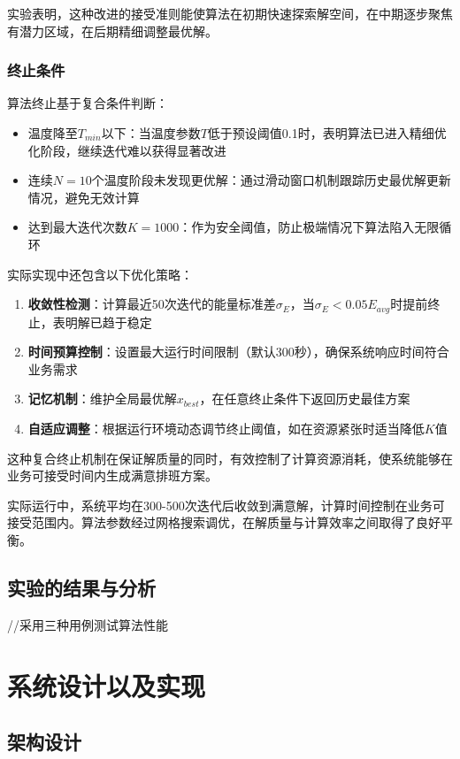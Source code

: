 \documentclass{ctexart}
\begin{document}
实验表明，这种改进的接受准则能使算法在初期快速探索解空间，在中期逐步聚焦有潜力区域，在后期精细调整最优解。

\subsubsection{终止条件}
算法终止基于复合条件判断：
\begin{itemize}
    \item 温度降至$T_{min}$以下：当温度参数$T$低于预设阈值0.1时，表明算法已进入精细优化阶段，继续迭代难以获得显著改进
    \item 连续$N=10$个温度阶段未发现更优解：通过滑动窗口机制跟踪历史最优解更新情况，避免无效计算
    \item 达到最大迭代次数$K=1000$：作为安全阈值，防止极端情况下算法陷入无限循环
\end{itemize}

实际实现中还包含以下优化策略：
\begin{enumerate}
    \item \textbf{收敛性检测}：计算最近50次迭代的能量标准差$\sigma_E$，当$\sigma_E < 0.05E_{avg}$时提前终止，表明解已趋于稳定
    \item \textbf{时间预算控制}：设置最大运行时间限制（默认300秒），确保系统响应时间符合业务需求
    \item \textbf{记忆机制}：维护全局最优解$x_{best}$，在任意终止条件下返回历史最佳方案
    \item \textbf{自适应调整}：根据运行环境动态调节终止阈值，如在资源紧张时适当降低$K$值
\end{enumerate}

这种复合终止机制在保证解质量的同时，有效控制了计算资源消耗，使系统能够在业务可接受时间内生成满意排班方案。

实际运行中，系统平均在300-500次迭代后收敛到满意解，计算时间控制在业务可接受范围内。算法参数经过网格搜索调优，在解质量与计算效率之间取得了良好平衡。

\subsection{实验的结果与分析}
//采用三种用例测试算法性能


\section{系统设计以及实现}
\subsection{架构设计}
\end{document}
